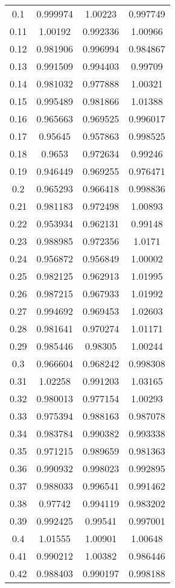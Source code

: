 \begin{table}[h!]
\begin{tabular}{|c|c|c|c|}
0.1 & 0.999974 & 1.00223 & 0.997749 \\
0.11 & 1.00192 & 0.992336 & 1.00966 \\
0.12 & 0.981906 & 0.996994 & 0.984867 \\
0.13 & 0.991509 & 0.994403 & 0.99709 \\
0.14 & 0.981032 & 0.977888 & 1.00321 \\
0.15 & 0.995489 & 0.981866 & 1.01388 \\
0.16 & 0.965663 & 0.969525 & 0.996017 \\
0.17 & 0.95645 & 0.957863 & 0.998525 \\
0.18 & 0.9653 & 0.972634 & 0.99246 \\
0.19 & 0.946449 & 0.969255 & 0.976471 \\
0.2 & 0.965293 & 0.966418 & 0.998836 \\
0.21 & 0.981183 & 0.972498 & 1.00893 \\
0.22 & 0.953934 & 0.962131 & 0.99148 \\
0.23 & 0.988985 & 0.972356 & 1.0171 \\
0.24 & 0.956872 & 0.956849 & 1.00002 \\
0.25 & 0.982125 & 0.962913 & 1.01995 \\
0.26 & 0.987215 & 0.967933 & 1.01992 \\
0.27 & 0.994692 & 0.969453 & 1.02603 \\
0.28 & 0.981641 & 0.970274 & 1.01171 \\
0.29 & 0.985446 & 0.98305 & 1.00244 \\
0.3 & 0.966604 & 0.968242 & 0.998308 \\
0.31 & 1.02258 & 0.991203 & 1.03165 \\
0.32 & 0.980013 & 0.977154 & 1.00293 \\
0.33 & 0.975394 & 0.988163 & 0.987078 \\
0.34 & 0.983784 & 0.990382 & 0.993338 \\
0.35 & 0.971215 & 0.989659 & 0.981363 \\
0.36 & 0.990932 & 0.998023 & 0.992895 \\
0.37 & 0.988033 & 0.996541 & 0.991462 \\
0.38 & 0.97742 & 0.994119 & 0.983202 \\
0.39 & 0.992425 & 0.99541 & 0.997001 \\
0.4 & 1.01555 & 1.00901 & 1.00648 \\
0.41 & 0.990212 & 1.00382 & 0.986446 \\
0.42 & 0.988403 & 0.990197 & 0.998188 \\

\end{tabular}
\end{table}
